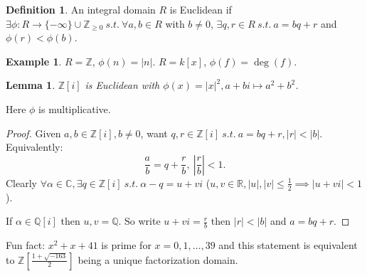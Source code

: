 \documentclass{article}
\newcommand{\R}{\mathbb{R}}
\newcommand{\C}{\mathbb{C}}
\newcommand{\Z}{\mathbb{Z}}
\newcommand{\Q}{\mathbb{Q}}
\newcommand{\st}{\ s.t.\ }
\newtheorem*{lemma}{Lemma}
\theoremstyle{definition}
\newtheorem*{definition}{Definition}
\newtheorem*{example}{Example}
\theoremstyle{remark}
\begin{document}
\begin{definition}
    An integral domain $R$ is Euclidean if $\exists \phi: R \to \{-\infty\} \cup \Z_{\geq 0} \st \forall a, b \in R$ with $b \neq 0$, $\exists q, r \in R \st a = bq + r$ and $\phi(r) < \phi(b)$.
\end{definition}

\begin{example}
    $R = \Z$, $\phi(n) = |n|$.
    $R = k[x]$, $\phi(f) = \deg(f)$.
\end{example}

\begin{lemma}
    $\Z[i]$ is Euclidean with $\phi(x) = |x|^2, a + bi \mapsto a^2 + b^2$.
\end{lemma}
Here $\phi$ is multiplicative. 
\begin{proof}
    Given $a, b \in \Z[i], b \neq 0$, want $q, r \in \Z[i] \st a = bq + r, |r| < |b|$. Equivalently: \[\frac{a}{b} = q + \frac{r}{b},\ \left|\frac{r}{b}\right| < 1.\]
    Clearly $\forall \alpha \in \C, \exists q \in \Z[i] \st \alpha - q = u + vi$ ($u, v \in \R, |u|, |v| \leq \frac{1}{2} \implies |u + vi| < 1$).
    
    If $\alpha \in \Q[i]$ then $u, v = \Q$. So write $u + vi = \frac{r}{b}$ then $|r| < |b|$ and $a = bq + r$.
\end{proof}

Fun fact: $x^2 + x + 41$ is prime for $x = 0, 1, \ldots, 39$ and this statement is equivalent to $\Z\left[\frac{1 + \sqrt{-163}}{2}\right]$ being a unique factorization domain.
\end{document}

